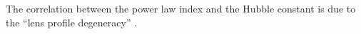 The correlation between the power law index and the Hubble constant is due to the ``lens profile degeneracy'' \citep{Kochanek04}.